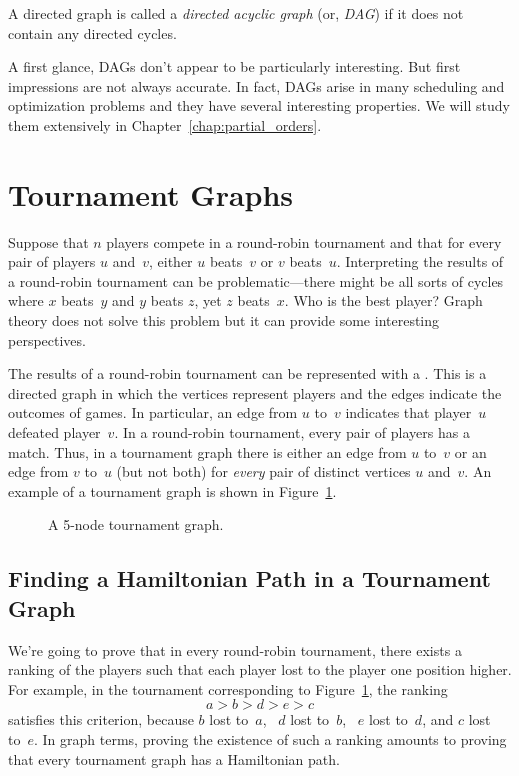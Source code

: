 \begin{definition}
A directed graph is called a \emph{directed acyclic graph} (or,
\emph{DAG}) if it does not contain any directed cycles.
\end{definition}

A first glance, DAGs don't appear to be particularly interesting.  But
first impressions are not always accurate.  In fact, DAGs arise in
many scheduling and optimization problems and they have several
interesting properties.  We will study them extensively in
Chapter~\ref{chap:partial_orders}.

\section{Tournament Graphs}

Suppose that $n$ players compete in a round-robin tournament and that
for every pair of players $u$ and~$v$, either $u$ beats~$v$ or $v$
beats~$u$.  Interpreting the results of a round-robin tournament can
be problematic---there might be all sorts of cycles where $x$
beats~$y$ and $y$ beats $z$, yet $z$ beats~$x$.  Who is the best
player?  Graph theory does not solve this problem but it can provide
some interesting perspectives.

The results of a round-robin tournament can be represented with a
.  This is a directed graph in which the
vertices represent players and the edges indicate the outcomes of
games.  In particular, an edge from $u$ to~$v$ indicates that
player~$u$ defeated player~$v$.  In a round-robin tournament, every
pair of players has a match.  Thus, in a tournament graph there is
either an edge from $u$ to~$v$ or an edge from $v$ to~$u$ (but not
both) for \emph{every} pair of distinct vertices $u$ and~$v$.  An
example of a tournament graph is shown in Figure~\ref{fig:6EE1}.

\begin{figure}


\caption{A 5-node tournament graph.}

\label{fig:6EE1}

\end{figure}

\subsection{Finding a Hamiltonian Path in a Tournament Graph}

We're going to prove that in every round-robin tournament, there
exists a ranking of the players such that each player lost to the
player one position higher.  For example, in the tournament
corresponding to Figure~\ref{fig:6EE1}, the ranking
\begin{equation*}
    a > b > d > e > c
\end{equation*}
satisfies this criterion, because $b$ lost to~$a$, \ $d$ lost to~$b$,
\ $e$ lost to~$d$, and $c$ lost to~$e$.  In graph terms, proving the
existence of such a ranking amounts to proving that every tournament
graph has a Hamiltonian path.


